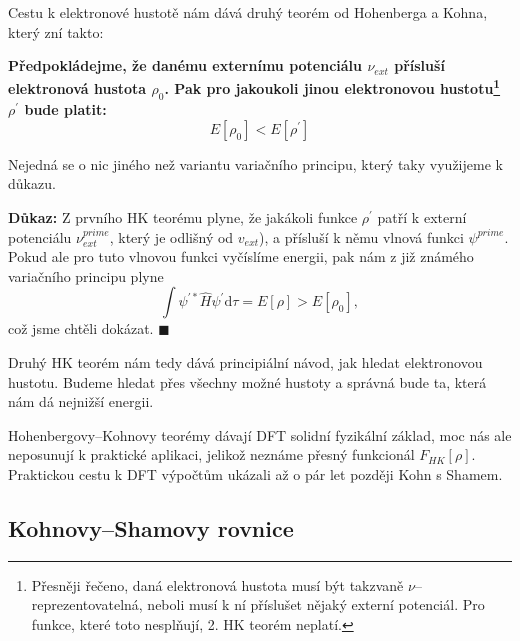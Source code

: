 Cestu k elektronové hustotě nám dává druhý teorém od Hohenberga a Kohna, který zní takto:

\bigskip
\textbf{Předpokládejme, že danému externímu potenciálu $\nu_{ext}$ přísluší elektronová hustota $\rho_0$. Pak pro jakoukoli jinou elektronovou hustotu\footnote{Přesněji řečeno, daná elektronová hustota musí být takzvaně $\nu$--{reprezentovatelná}, neboli musí k ní příslušet nějaký externí potenciál. Pro funkce, které toto nesplňují, 2. HK teorém neplatí.} $\rho^{\prime}$ bude platit:}
\begin{equation}
E[\rho_0] < E[\rho^{\prime}]
\label{rov:dft:HK2}
\end{equation}

Nejedná se o nic jiného než variantu variačního principu, který taky využijeme k důkazu.

\bigskip
\textbf{Důkaz:} Z prvního HK teorému plyne, že jakákoli funkce $\rho^{\prime}$ patří k externí potenciálu $\nu_{ext}^{prime}$, který je odlišný od $v_{ext}$), a přísluší k němu vlnová funkci $\psi^{prime}$. Pokud ale pro tuto vlnovou funkci vyčíslíme energii, pak nám z již známého variačního principu plyne
\begin{equation}
\int \psi^{\prime *} \hat{H} \psi^{\prime} \mathrm{d}\tau = E[\rho] > E [\rho_0],
\end{equation}
což jsme chtěli dokázat. \hfill {\footnotesize $\blacksquare$}

Druhý HK teorém nám tedy dává principiální návod, jak hledat elektronovou hustotu. Budeme hledat přes všechny možné hustoty a správná bude ta, která nám dá nejnižší energii.

Hohenbergovy--Kohnovy teorémy dávají DFT solidní fyzikální základ, moc nás ale neposunují k praktické aplikaci, jelikož neznáme přesný funkcionál $F_{HK}[\rho]$.
Praktickou cestu k DFT výpočtům ukázali až o pár let později Kohn s Shamem.

\subsection{Kohnovy--Shamovy rovnice}

